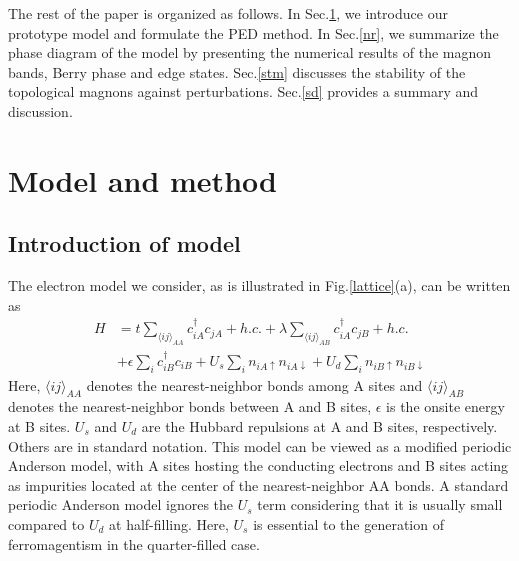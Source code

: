 \documentclass[amsmath,superscriptaddress,showpacs,aps,prb,twocolumn]{revtex4-1}
\begin{document}
\par The rest of the paper is organized as follows. In Sec.\ref{mm}, we introduce our prototype model and formulate the PED method. In Sec.\ref{nr}, we summarize the phase diagram of the model by presenting the numerical results of the magnon bands, Berry phase and edge states. Sec.\ref{stm} discusses the stability of the topological magnons against perturbations. Sec.\ref{sd} provides a summary and discussion.

\section{Model and method}\label{mm}
\subsection{Introduction of model}
\par The electron model we consider, as is illustrated in Fig.\ref{lattice}(a), can be written as
\begin{equation}\label{model}
\begin{aligned}
    H   &   =t\sum_{\langle ij\rangle_{AA}}c_{iA}^\dagger c_{jA}+h.c.+ \lambda\sum_{\langle ij\rangle_{AB}}c_{iA}^\dagger c_{jB}+h.c.\\
        &   +\epsilon\sum_i c^\dagger_{iB}c_{iB}+U_s\sum_i n_{iA\uparrow}n_{iA\downarrow}+U_d\sum_in_{iB\uparrow}n_{iB\downarrow}
\end{aligned}
\end{equation}
Here, $\langle ij\rangle_{AA}$ denotes the nearest-neighbor bonds among A sites and $\langle ij\rangle_{AB}$ denotes the nearest-neighbor bonds between A and B sites, $\epsilon$ is the onsite energy at B sites. $U_s$ and $U_d$ are the Hubbard repulsions at A and B sites, respectively. Others are in standard notation. This model can be viewed as a modified periodic Anderson model, with A sites hosting the conducting electrons and B sites acting as impurities located at the center of the nearest-neighbor AA bonds. A standard periodic Anderson model ignores the $U_s$ term considering that it is usually small compared to $U_d$ at half-filling. Here, $U_s$ is essential to the generation of ferromagentism in the quarter-filled case\cite{T_PRL1992}.
\end{document}

